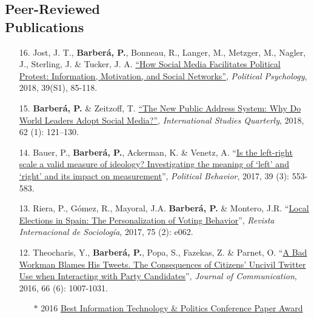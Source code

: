 \documentclass[margin,line,11pt]{resume}
\begin{document}
\begin{resume}
    \section{\mysidestyle Peer-Reviewed\\Publications}
\vspace{.15cm}    
\begin{itemize}[leftmargin=5.5mm]
\item[16.] Jost, J. T., \textbf{Barber\'{a}, P.}, Bonneau, R., Langer, M., Metzger, M., Nagler, J., Sterling, J. \& Tucker, J. A. \href{http://onlinelibrary.wiley.com/doi/10.1111/pops.12478/full}{``How Social Media Facilitates Political Protest: Information, Motivation, and Social Networks''}, \textit{Political Psychology}, 2018, 39(S1), 85-118.

\item[15.] \textbf{Barber\'{a}, P.} \& Zeitzoff, T. \href{https://academic.oup.com/isq/article/doi/10.1093/isq/sqx047/4430887/The-New-Public-Address-System-Why-Do-World-Leaders}{``The New Public Address System: Why Do World Leaders Adopt Social Media?''}, \textit{International Studies Quarterly}, 2018, 62 (1): 121--130.
    
\item[14.] Bauer, P., \textbf{Barber\'{a}, P.}, Ackerman, K. \& Venetz, A. ``\href{http://link.springer.com/article/10.1007/s11109-016-9368-2}{Is the left-right scale a valid measure of ideology? Investigating the meaning of `left' and `right' and its impact on measurement}'', \textit{Political Behavior}, 2017, 39 (3): 553-583.

\item[13.] Riera, P., G\'{o}mez, R., Mayoral, J.A. \textbf{Barber\'{a}, P.} \& Montero, J.R. ``\href{http://revintsociologia.revistas.csic.es/index.php/revintsociologia/article/view/675/832}{Local Elections in Spain: The Personalization of Voting Behavior}'', \textit{Revista Internacional de Sociolog\'{i}a}, 2017, 75 (2): e062.
    
\item[12.] Theocharis, Y., \textbf{Barber\'{a}, P.}, Popa, S., Fazekas, Z. \& Parnet, O. ``\href{http://onlinelibrary.wiley.com/doi/10.1111/jcom.12259/abstract}{A Bad Workman Blames His Tweets. The Consequences of Citizens' Uncivil Twitter Use when Interacting with Party Candidates}'', \textit{Journal of Communication}, 2016, 66 (6): 1007-1031.
\begin{itemize}
\item[] $\ast$ 2016 \href{http://www.apsanet.org/section-18-best-conference-paper-award}{Best Information Technology \& Politics Conference Paper Award}
\end{itemize}
    

\end{itemize}
\end{resume}
\end{document}
